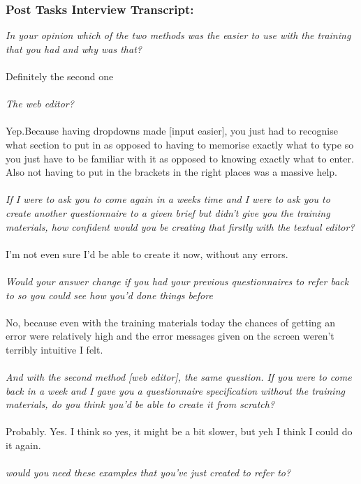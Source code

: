 \documentclass{report}
\begin{document}
\subsubsection*{Post Tasks Interview Transcript:}
\textit{In your opinion which of the two methods was the easier to use with the training that you had and why was that? } \\
\\
Definitely the second one
\\
\\
\textit{The web editor?}
\\
\\
Yep.Because having dropdowns made [input easier], you just had to recognise what section to put in as opposed to having to memorise exactly what to type so you just have to be familiar with it as opposed to knowing exactly what to enter. Also not having to put in the brackets in the right places was a massive help.
\\
\\
\textit{If I were to ask you to come again in a weeks time and I were to ask you to create another questionnaire to a given brief but didn't give you the training materials, how confident would you be creating that firstly with the textual editor?}
\\
\\
I'm not even sure I'd be able to create it now, without any errors.
\\
\\
\textit{Would your answer change if you had your previous questionnaires to refer back to so you could see how you'd done things before}\\
\\
No, because even with the training materials today the chances of getting an error were relatively high and the error messages given on the screen weren't terribly intuitive I felt.
\\
\\
\textit{And with the second method [web editor], the same question. If you were to come back in a week and I gave you a questionnaire specification without the training materials, do you think you'd be able to create it from scratch?}
\\
\\
Probably. Yes. I think so yes, it might be a bit slower, but yeh I think I could do it again.
\\
\\
\textit{would you need these examples that you've just created to refer to?}
\end{document}
